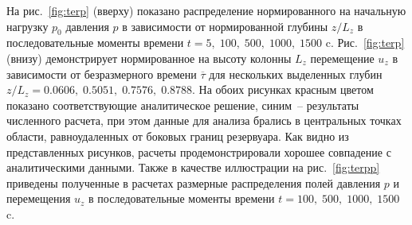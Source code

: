 На рис.~\ref{fig:terp} (вверху) показано распределение нормированного на начальную нагрузку $p_0$ давления $p$ в зависимости
от нормированной глубины $z/L_z$ в последовательные моменты времени $t = 5, \; 100, \; 500, \; 1000, \; 1500$ c.
Рис.~\ref{fig:terp} (внизу) демонстрирует нормированное на высоту колонны $L_z$
перемещение $u_z$ в зависимости от безразмерного времени $\overline{\tau}$ для нескольких выделенных глубин
$z/L_z = 0.0606, \; 0.5051, \; 0.7576, \; 0.8788$. На обоих рисунках красным цветом показано
соответствующие аналитическое решение, синим~-- результаты численного расчета, при этом данные для анализа брались в центральных точках области,
равноудаленных от боковых границ резервуара.
Как видно из представленных рисунков, расчеты продемонстрировали хорошее совпадение с аналитическими
данными. Также в качестве иллюстрации на рис.~\ref{fig:terpp}
приведены полученные в расчетах размерные распределения
полей давления $p$ и перемещения $u_z$ в последовательные моменты времени
$t = 100, \; 500, \; 1000, \; 1500$ c.

